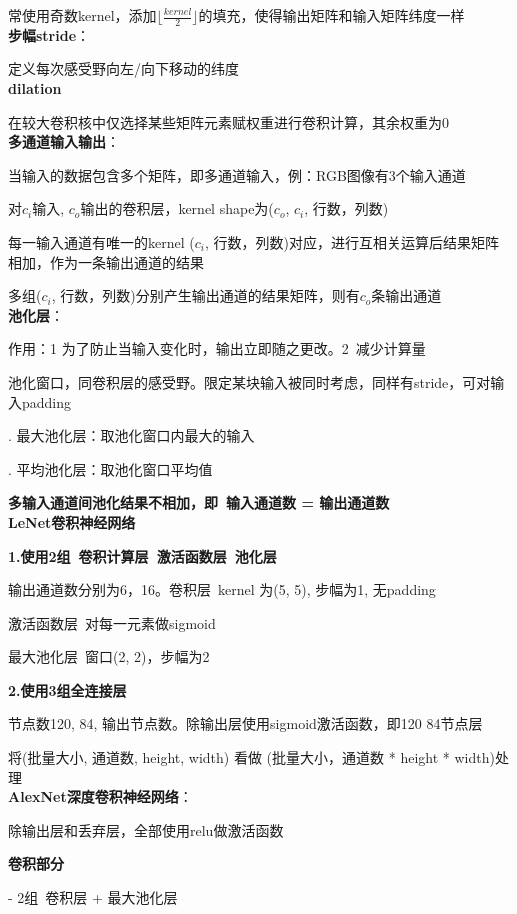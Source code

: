 \documentclass[UTF8]{ctexart}
\begin{document}
  常使用奇数kernel，添加$\lfloor \frac{kernel}{2}\rfloor $的填充，使得输出矩阵和输入矩阵纬度一样\\
\textbf{步幅stride}：

  定义每次感受野向左/向下移动的纬度\\
\textbf{dilation}

  在较大卷积核中仅选择某些矩阵元素赋权重进行卷积计算，其余权重为0\\
\textbf{多通道输入输出}：

  当输入的数据包含多个矩阵，即多通道输入，例：RGB图像有3个输入通道

  对$c_i$输入, $c_o$输出的卷积层，kernel shape为($c_o$, $c_i$, 行数，列数)

  \quad 每一输入通道有唯一的kernel ($c_i$, 行数，列数)对应，进行互相关运算后结果矩阵相加，作为一条输出通道的结果

  \quad 多组($c_i$, 行数，列数)分别产生输出通道的结果矩阵，则有$c_o$条输出通道\\
\textbf{池化层}：
  
  作用：1 为了防止当输入变化时，输出立即随之更改。2\ 减少计算量

  池化窗口，同卷积层的感受野。限定某块输入被同时考虑，同样有stride，可对输入padding

  . 最大池化层：取池化窗口内最大的输入

  . 平均池化层：取池化窗口平均值

  \textbf{多输入通道间池化结果不相加，即\ 输入通道数 = 输出通道数}\\
\textbf{LeNet卷积神经网络}

  \textbf{1.使用2组\ 卷积计算层\ 激活函数层\ 池化层}

  \quad 输出通道数分别为6，16。卷积层\ kernel 为(5, 5), 步幅为1, 无padding

  \quad 激活函数层\ 对每一元素做sigmoid

  \quad 最大池化层\ 窗口(2, 2)，步幅为2

  \textbf{2.使用3组全连接层}

  \quad 节点数120, 84, 输出节点数。除输出层使用sigmoid激活函数，即120 84节点层

  \quad 将(批量大小, 通道数, height, width) 看做 (批量大小，通道数 * height * width)处理\\
\textbf{AlexNet深度卷积神经网络}：

  除输出层和丢弃层，全部使用relu做激活函数

  \textbf{卷积部分}
  
  \quad - 2组\ 卷积层 + 最大池化层
  
\end{document}

